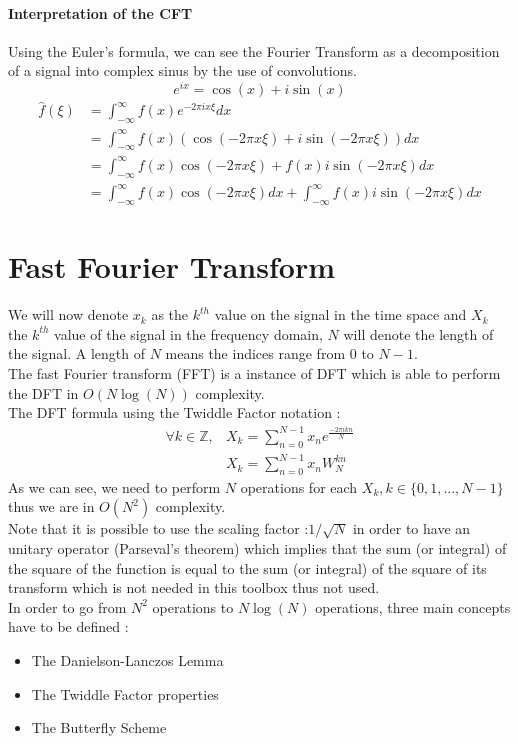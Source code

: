 \documentclass[a4paper]{report}
\begin{document}
\paragraph{Interpretation of the CFT}
Using the Euler's formula, we can see the Fourier Transform as a decomposition of a signal into complex sinus by the use of convolutions.
\[
e^{ix}=\cos(x)+i\sin(x)
\]
\begin{align*}
\hat{f}(\xi)&=\int_{-\infty}^{\infty} f(x) e^{-2\pi i x \xi}dx\\
&=\int_{-\infty}^{\infty} f(x) (\cos(-2\pi x \xi)+i\sin(-2\pi x \xi))dx\\
&=\int_{-\infty}^{\infty} f(x) \cos(-2\pi x \xi)+f(x)i\sin(-2\pi x \xi)dx\\
&=\int_{-\infty}^{\infty} f(x) \cos(-2\pi x \xi) dx + \int_{-\infty}^{\infty} f(x)i\sin(-2\pi x \xi)dx
\end{align*}

\section{Fast Fourier Transform}
We will now denote $x_k$ as the $k^{th}$ value on the signal in the time space and $X_k$ the $k^{th}$ value of the signal in the frequency domain, $N$ will denote the length of the signal. A length of $N$ means the indices range from $0$ to $N-1$.
\\
The fast Fourier transform (FFT) is a instance of DFT which is able to perform the DFT in $O(N\log(N))$ complexity.\\
The DFT formula using the Twiddle Factor notation :
\begin{align*}
\forall k \in \mathbb{Z},&X_k=\sum_{n=0}^{N-1} x_n e^{\frac{-2\pi i k n}{N}}\\
&X_k=\sum_{n=0}^{N-1} x_n W_N^{kn}
\end{align*}
As we can see, we need to perform $N$ operations for each $X_k,k\in \{0,1,...,N-1\}$ thus we are in $O(N^2)$ complexity.
\\
Note that it is possible to use the scaling factor :$1/\sqrt{N}$ in order to have an unitary operator (Parseval's theorem) which implies that the sum (or integral) of the square of the function is equal to the sum (or integral) of the square of its transform which is not needed in this toolbox thus not used.\\
In order to go from $N^2$ operations to $N\log(N)$ operations, three main concepts have to be defined :
\begin{itemize}
\item The Danielson-Lanczos Lemma
\item The Twiddle Factor properties
\item The Butterfly Scheme
\end{itemize}
\end{document}
